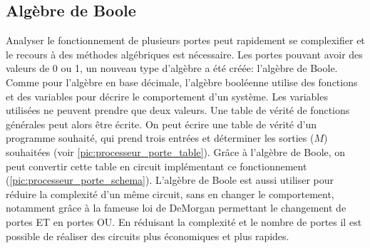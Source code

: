 \subsection{Algèbre de Boole}
Analyser le fonctionnement de plusieurs portes peut rapidement se complexifier et le recours à des méthodes algébriques est nécessaire. Les portes pouvant avoir des valeurs de 0 ou 1, un nouveau type d'algèbre a été créée: l'algèbre de Boole. Comme pour l'algèbre en base décimale, l'algèbre booléenne utilise des fonctions et des variables pour décrire le comportement d'un système. Les variables utilisées ne peuvent prendre que deux valeurs. Une table de vérité de fonctions générales peut alors être écrite. On peut écrire une table de vérité d'un programme souhaité, qui prend trois entrées et déterminer les sorties ($M$) souhaitées (voir \autoref{pic:processeur_porte_table}). Grâce à l'algèbre de Boole, on peut convertir cette table en circuit implémentant ce fonctionnement (\autoref{pic:processeur_porte_schema}).
L'algèbre de Boole est aussi utiliser pour réduire la complexité d'un même circuit, sans en changer le comportement, notamment grâce à la fameuse loi de DeMorgan \cite{hurley2014concise} permettant le changement de portes ET en portes OU. En réduisant la complexité et le nombre de portes il est possible de réaliser des circuits plus économiques et plus rapides.


